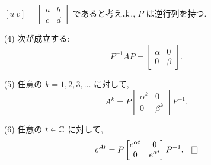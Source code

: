 \documentclass[12pt,twoside]{jarticle}
\begin{document}
\begin{question}
\begin{enumerate}
{      $[u\ v] = \begin{bmatrix}a&b\\c&d\end{bmatrix}$ であると考えよ.}, %
    $P$ は逆行列を持つ. 
  \item[(4)] 次が成立する:
    \begin{equation*}
      P^{-1} A P = \begin{bmatrix}\alpha & 0\\0 & \beta\end{bmatrix}.
    \end{equation*}
  \item[(5)] 任意の $k=1,2,3,\ldots$ に対して,
    \begin{equation*}
      A^k = P \begin{bmatrix}\alpha^k & 0\\0 & \beta^k\end{bmatrix} P^{-1}.
    \end{equation*}
  \item[(6)] 任意の $t\in{\mathbb C}$ に対して,
    \begin{equation*}
      e^{At} =
      P
      \begin{bmatrix}
        e^{\alpha t} & 0 \\
        0 & e^{\alpha t} \\
      \end{bmatrix}
      P^{-1}.
    \qed
    \end{equation*}
  \end{enumerate}
\end{question}

\end{document}
